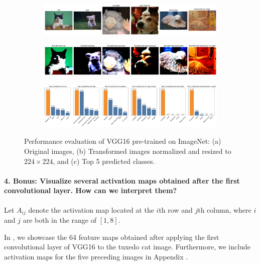 \begin{figure}[H]
    \centering
    \begin{subfigure}{0.95\textwidth}
        \includegraphics[width=\textwidth]{original_images}
        \caption{}
        \label{subfig:original_images}
    \end{subfigure}
    \begin{subfigure}{0.95\textwidth}
        \includegraphics[width=\textwidth]{transformed_images}
        \caption{}
        \label{subfig:transformed_images}
    \end{subfigure}
    \begin{subfigure}{0.95\textwidth}
        \includegraphics[width=\textwidth]{prediction_plots}
        \caption{}
        \label{subfig:prediction_plots}
    \end{subfigure}
    \caption{Performance evaluation of VGG16 pre-trained on ImageNet: (a) Original images, (b) Transformed images normalized and resized to $224 \times 224$, and (c) Top 5 predicted classes.}
    \label{fig:vgg16}
\end{figure}


\paragraph{4. \textbf{Bonus}: Visualize several activation maps obtained after the first convolutional layer. How can we interpret them?}
Let $A_{ij}$ denote the activation map located at the $i$th row and $j$th column, where $i$ and $j$ are both in the range of $[1, 8]$.

In , we showcase the 64 feature maps obtained after applying the first convolutional layer of VGG16 to the tuxedo cat image. Furthermore, we include activation maps for the five preceding images in Appendix .

